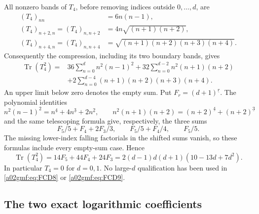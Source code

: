 All nonzero bands of \(T_4\), before removing indices outside \(0,\ldots,d\),
are
\[
 \begin{split}
 (T_4)_{nn}&=6n(n-1),\\
 (T_4)_{n+2,n}=(T_4)_{n,n+2}
       &=4n\sqrt{(n+1)(n+2)},\\
 (T_4)_{n+4,n}=(T_4)_{n,n+4}
       &=\sqrt{(n+1)(n+2)(n+3)(n+4)} .
 \end{split}
\]
Consequently the compression, including its two boundary bands, gives
\[
 \begin{split}
 \operatorname{Tr}(T_4^2)
 ={}&36\sum_{n=0}^d n^2(n-1)^2
     +32\sum_{n=0}^{d-2}n^2(n+1)(n+2)\\
    &+2\sum_{n=0}^{d-4}(n+1)(n+2)(n+3)(n+4).
 \end{split}
\]
An upper limit below zero denotes the empty sum. Put
\(F_r=(d+1)^{\underline r}\). The polynomial identities
\[
 n^2(n-1)^2=n^{\underline4}+4n^{\underline3}+2n^{\underline2},
 \qquad
 n^2(n+1)(n+2)=(n+2)^{\underline4}+(n+2)^{\underline3}
\]
and the same telescoping formula give, respectively, the three sums
\[
 F_5/5+F_4+2F_3/3,\qquad F_5/5+F_4/4,\qquad F_5/5.
\]
The missing lower-index falling factorials in the shifted sums vanish, so
these formulas include every empty-sum case. Hence
\begin{equation}
 \boxed{\displaystyle
 \operatorname{Tr}(T_4^2)=14F_5+44F_4+24F_3
             =2(d-1)d(d+1)(10-13d+7d^2).}
 \tag{FCD9}\label{a02gmf:eq:FCD9}
\end{equation}
In particular \(T_4=0\) for \(d=0,1\). No large-\(d\) qualification
has been used in \eqref{a02gmf:eq:FCD8} or \eqref{a02gmf:eq:FCD9}.

\subsection{The two exact logarithmic coefficients}


